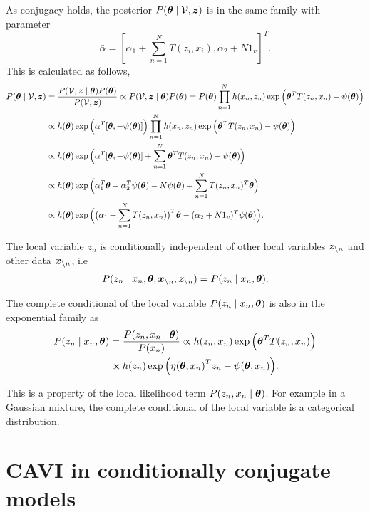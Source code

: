 As conjugacy holds, the posterior \(P(\bm{\theta} \mid \mathcal{V}, \bm{z})\) is in the same family with parameter
\[
  \bar{\alpha} = [\alpha_{1} + \sum_{n=1}^{N} T(z_{i}, x_{i}), \alpha_{2}+ N1_{v}]^{T}.
\]
This is calculated as follows,
\[
  \begin{aligned}
    P(\bm{\theta} \mid \mathcal{V}, \bm{z}) &= \frac{P(\mathcal{V}, \bm{z} \mid \bm{\theta}) P(\bm{\theta})}{P(\mathcal{V}, \bm{z})} \propto  P(\mathcal{V}, \bm{z} \mid \bm{\theta}) P(\bm{\theta}) = P(\bm{\theta}) \prod_{n=1}^{N}h(x_{n}, z_{n})\exp \Big( \bm{\theta}^{T}T(z_{n}, x_{n})  - \psi(\bm{\theta}) \Big)\\
    &\propto  h(\bm{\theta}) \exp \Big( \alpha^{T}[\bm{\theta}, -\psi(\bm{\theta})]\Big)  \prod_{n=1}^{N}h(x_{n}, z_{n})\exp \Big( \bm{\theta}^{T}T(z_{n}, x_{n})  - \psi(\bm{\theta}) \Big)\\
    &\propto h(\bm{\theta}) \exp \Big(   \alpha^{T}[\bm{\theta}, -\psi(\bm{\theta})] + \sum_{n=1}^{N}  \bm{\theta}^{T}T(z_{n}, x_{n})  - \psi(\bm{\theta})  \Big)\\
    &\propto h(\bm{\theta}) \exp \Big(   \alpha_{1}^{T}\bm{\theta}  - \alpha_{2}^{T}\psi(\bm{\theta}) - N\psi(\bm{\theta}) + \sum_{n=1}^{N}  T(z_{n}, x_{n})^{T}\bm{\theta}  \Big)\\
    &\propto h(\bm{\theta}) \exp \Big(   \big(\alpha_{1} + \sum_{n=1}^{N}  T(z_{n}, x_{n})\big)^{T} \bm{\theta}  - (\alpha_{2} + N1_{v})^{T}\psi(\bm{\theta}) \Big).
  \end{aligned}
\]

The local variable \(z_{n}\) is conditionally independent of other local variables \(\bm{z}_{\backslash n}\)  and other data \(\bm{x}_{\backslash n}\), i.e
\[
  P(z_{n} \mid x_{n}, \bm{\theta}, \bm{x}_{\backslash n}, \bm{z}_{\backslash n}) = P(z_{n} \mid x_{n}, \bm{\theta}).
\]

The complete conditional of the local variable \(P(z_{n} \mid x_{n}, \bm{\theta})\) is also in the exponential family as
\[
  \begin{aligned}
    P(z_{n}\mid x_{n} , \bm{\theta}) &= \frac{P(z_{n}, x_{n} \mid \bm{\theta})}{P(x_{n})} \propto  h(z_{n}, x_{n}) \exp \Big( \bm{\theta}^{T} T(z_{n}, x_{n})\Big)\\
    &\propto h(z_{n})\exp \Big( {\eta(\bm{\theta}, x_{n})}^{T}z_{n} - \psi(\bm{\theta}, x_{n}) \Big).
  \end{aligned}
\]

This is a property of the local likelihood term \(P(z_{n}, x_{n} \mid \bm{\theta})\). For example in a Gaussian mixture, the complete conditional of the local variable is a categorical distribution.


\section{CAVI in conditionally conjugate models}

